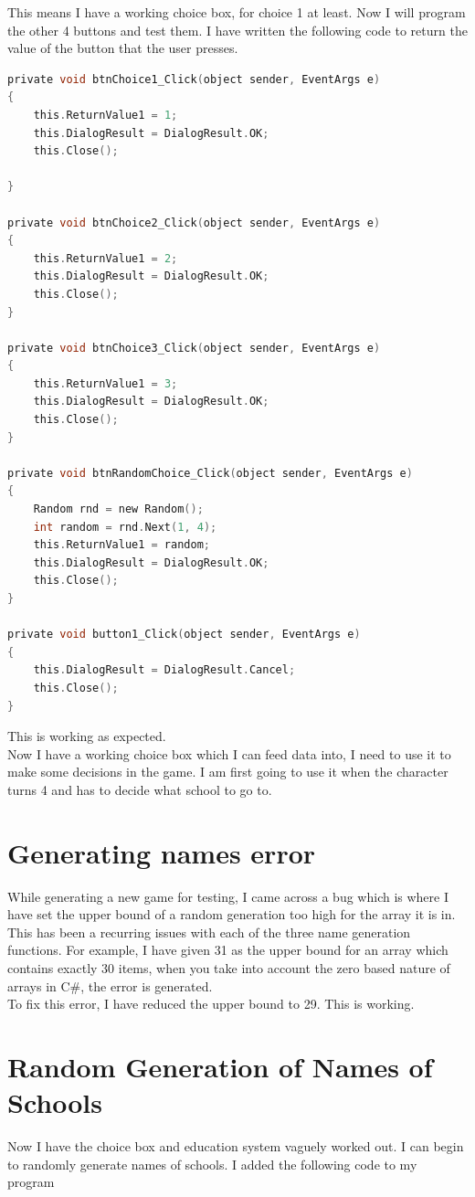 \noindent This means I have a working choice box, for choice 1 at least.
Now I will program the other 4 buttons and test them. I have written the following code to return the value of the button that the user presses.
\begin{lstlisting}[language=c, style=csharp, caption=Code which returns the outcome of the choice box]
private void btnChoice1_Click(object sender, EventArgs e)
{
    this.ReturnValue1 = 1;
    this.DialogResult = DialogResult.OK;
    this.Close();
    
}

private void btnChoice2_Click(object sender, EventArgs e)
{
    this.ReturnValue1 = 2;
    this.DialogResult = DialogResult.OK;
    this.Close();
}

private void btnChoice3_Click(object sender, EventArgs e)
{
    this.ReturnValue1 = 3;
    this.DialogResult = DialogResult.OK;
    this.Close();
}

private void btnRandomChoice_Click(object sender, EventArgs e)
{
    Random rnd = new Random();
    int random = rnd.Next(1, 4);
    this.ReturnValue1 = random;
    this.DialogResult = DialogResult.OK;
    this.Close();
}

private void button1_Click(object sender, EventArgs e)
{
    this.DialogResult = DialogResult.Cancel;
    this.Close();
}
\end{lstlisting}
This is working as expected.\\
Now I have a working choice box which I can feed data into, I need to use it to make some decisions in the game. I am first going to use it when the character turns 4 and has to decide what school to go to. 

\section{Generating names error}
While generating a new game for testing, I came across a bug which is where I have set the upper bound of a random generation too high for the array it is in. This has been a recurring issues with each of the three name generation functions. 
For example, I have given 31 as the upper bound for an array which contains exactly 30 items, when you take into account the zero based nature of arrays in C\#, the error is generated.\\
To fix this error, I have reduced the upper bound to 29. This is working.

\section{Random Generation of Names of Schools}
Now I have the choice box and education system vaguely worked out. I can begin to randomly generate names of schools.
I added the following code to my program

